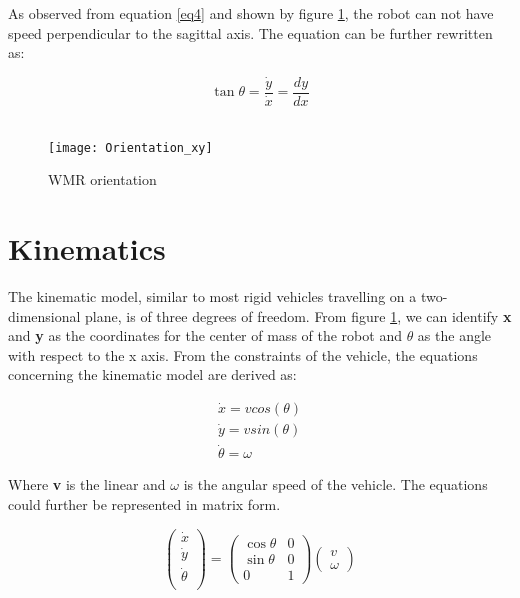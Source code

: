 As observed from equation \ref{eq4} and shown by figure \ref{fig::xy_orient}, the robot can not have speed perpendicular to the sagittal axis. The equation can be further rewritten as:

\begin{equation} \label{eq5} 
\tan{\theta} = \frac{\dot{y}}{\dot{x}} = \frac{dy}{dx}
\end{equation} 
\\

\begin{figure}[h]
\centering
\texttt{[image: Orientation\_xy]}
\caption{WMR orientation}
\label{fig::xy_orient}
\end{figure}

\section{Kinematics} \label{kinematics}

The kinematic model, similar to most rigid vehicles travelling on a two-dimensional plane, is of three degrees of freedom. From figure \ref{fig::xy_orient}, we can identify \textbf{x} and \textbf{y} as the coordinates for the center of mass of the robot and \textbf{$\theta$} as the angle with respect to the x axis. From the constraints of the vehicle, the equations concerning the kinematic model are derived as:

\begin{align}
\dot{x} = vcos(\theta) \nonumber \\
\dot{y} = vsin(\theta) \label{eq6} \\
\dot{\theta} = \omega  \nonumber 
\end{align}

Where \textbf{v} is the linear and \textbf{$\omega$} is the angular speed of the vehicle.
The equations could further be represented in matrix form.

\begin{equation} \label{eq7} 
\begin{pmatrix}
	\dot{x} \\
	\dot{y} \\
	\dot{\theta} \\ 
\end{pmatrix} 
=
\begin{pmatrix} 
	\cos{\theta} & 0 \\
	\sin{\theta} & 0 \\
	0     		 & 1  
\end{pmatrix}
\begin{pmatrix}
	v \\
	\omega
\end{pmatrix}  	
\end{equation}


